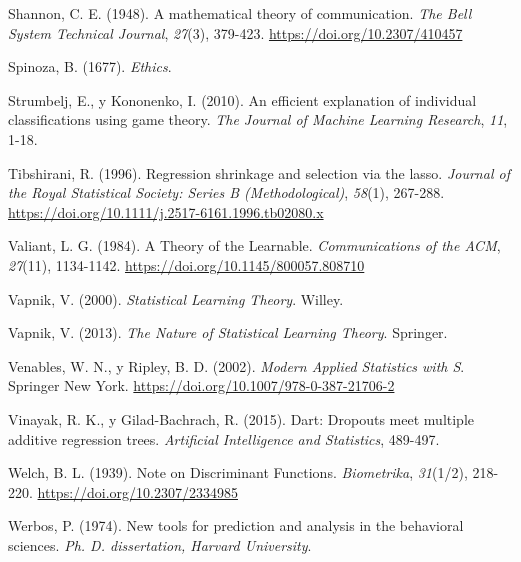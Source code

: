 \documentclass[
]{book}
\newlength{\cslhangindent}
\newlength{\cslentryspacingunit} %
\newenvironment{CSLReferences}[2] %
 {%
  \setlength{\parindent}{0pt}
  \ifodd #1
  \let\oldpar\par
  \def\par{\hangindent=\cslhangindent\oldpar}
  \fi
  \setlength{\parskip}{#2\cslentryspacingunit}
 }%
 {}
\theoremstyle{break}
\theoremstyle{nonumberplain}
\begin{document}
\begin{CSLReferences}{1}{0}
\leavevmode{}%
Shannon, C. E. (1948). A mathematical theory of communication. \emph{The Bell System Technical Journal}, \emph{27}(3), 379-423. \url{https://doi.org/10.2307/410457}

\leavevmode{}%
Spinoza, B. (1677). \emph{Ethics}.

\leavevmode{}%
Strumbelj, E., y Kononenko, I. (2010). An efficient explanation of individual classifications using game theory. \emph{The Journal of Machine Learning Research}, \emph{11}, 1-18.

\leavevmode{}%
Tibshirani, R. (1996). Regression shrinkage and selection via the lasso. \emph{Journal of the Royal Statistical Society: Series B (Methodological)}, \emph{58}(1), 267-288. \url{https://doi.org/10.1111/j.2517-6161.1996.tb02080.x}

\leavevmode{}%
Valiant, L. G. (1984). A Theory of the Learnable. \emph{Communications of the ACM}, \emph{27}(11), 1134-1142. \url{https://doi.org/10.1145/800057.808710}

\leavevmode{}%
Vapnik, V. (2000). \emph{Statistical Learning Theory}. Willey.

\leavevmode{}%
Vapnik, V. (2013). \emph{The Nature of Statistical Learning Theory}. Springer.

\leavevmode{}%
Venables, W. N., y Ripley, B. D. (2002). \emph{Modern Applied Statistics with S}. Springer New York. \url{https://doi.org/10.1007/978-0-387-21706-2}

\leavevmode{}%
Vinayak, R. K., y Gilad-Bachrach, R. (2015). Dart: Dropouts meet multiple additive regression trees. \emph{Artificial Intelligence and Statistics}, 489-497.

\leavevmode{}%
Welch, B. L. (1939). Note on Discriminant Functions. \emph{Biometrika}, \emph{31}(1/2), 218-220. \url{https://doi.org/10.2307/2334985}

\leavevmode{}%
Werbos, P. (1974). New tools for prediction and analysis in the behavioral sciences. \emph{Ph. D. dissertation, Harvard University}.


\end{CSLReferences}
\end{document}

